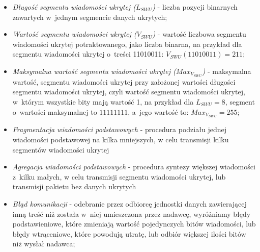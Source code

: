 \documentclass[a4paper, twoside, openright, 12pt]{report}
\begin{document}
\begin{itemize}
        \item \emph{Długość segmentu wiadomości ukrytej (\( L_{SWU} \))} - liczba
                pozycji binarnych zawartych w~jednym segmencie danych ukrytych;

        \item \emph{Wartość segmentu wiadomości ukrytej (\( V_{SWU} \))} - wartość
            liczbowa segmentu wiadomości ukrytej potraktowanego, jako liczba binarna,
            na przykład dla segmentu wiadomości ukrytej o~treści 11010011:
            \( V_{SWU}(11010011) = 211 \);

       \item \emph{Maksymalna wartość segmentu wiadomości ukrytej (\( Max_{V_{SWU}} \))} -
           maksymalna wartość, segmentu wiadomości ukrytej przy
           założonej wartości długości segmentu wiadomości ukrytej, czyli wartość
           segmentu wiadomości ukrytej, w~którym wszystkie bity mają wartość 1,
           na przykład dla \( L_{SWU} = 8 \), segment o~wartości maksymalnej to
           \( 11111111 \), a~jego wartość to: \( Max_{V_{SWU}} = 255 \);

       \item \emph{Fragmentacja wiadomości podstawowych} -
           procedura podziału jednej wiadomości podstawowej na
           kilka mniejszych, w celu transmisji kilku segmentów wiadomości ukrytej

       \item \emph{Agregacja wiadomości podstawowych} - procedura syntezy większej wiadomości
           z~kilku małych, w celu transmisji segmentu wiadomości ukrytej, lub transmisji
           pakietu bez danych ukrytych

       \item \emph{Błąd komunikacji} - odebranie przez odbiorcę
           jednostki danych zawierającej inną treść niż została w~niej
           umieszczona przez nadawcę, wyróżniamy błędy podstawieniowe, które
           zmieniają wartość pojedynczych bitów wiadomości, lub błędy wtrąceniowe,
           które powodują utratę, lub odbiór większej ilości bitów niż wysłał nadawca;

    \end{itemize}
\end{document}
